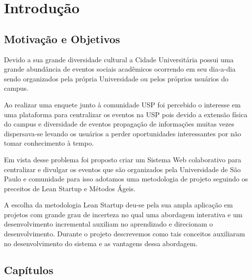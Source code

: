 \chapter{Introdução}
\label{cap:introducao}
\section{Motivação e Objetivos}

\par Devido a sua grande diversidade cultural a Cidade Universitária possui uma grande abundância de eventos sociais acadêmicos ocorrendo em seu dia-a-dia sendo organizados pela própria Universidade ou pelos próprios usuários do campus.

\par Ao realizar uma enquete junto à comunidade USP foi percebido o interesse em uma plataforma para centralizar os eventos na USP pois devido a extensão física do campus e diversidade de eventos propagação de informações muitas vezes dispersava-se levando os usuários a perder oportunidades interessantes por não tomar conhecimento à tempo.

\par Em vista desse problema foi proposto criar um Sistema Web colaborativo para centralizar e divulgar os eventos que são organizados pela Universidade de São Paulo e comunidade para isso adotamos uma metodologia de projeto seguindo os preceitos de Lean Startup e Métodos Ágeis.

\par A escolha da metodologia Lean Startup deu-se pela sua ampla aplicação em projetos com grande grau de incerteza no qual uma abordagem interativa e um desenvolvimento incremental auxiliam no aprendizado e direcionam o desenvolvimento. Durante o projeto descrevemos como tais conceitos auxiliaram no desenvolvimento do sistema e as vantagens dessa abordagem.

\section{Capítulos}
